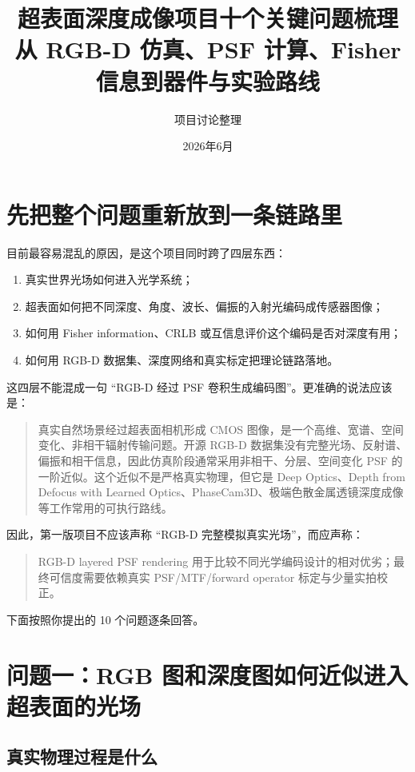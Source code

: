 \documentclass[11pt,a4paper,fontset=none]{ctexart}
\title{\bfseries 超表面深度成像项目十个关键问题梳理\\
\large 从 RGB-D 仿真、PSF 计算、Fisher 信息到器件与实验路线}
\author{项目讨论整理}
\date{2026年6月}
\begin{document}
\maketitle
\tableofcontents
\newpage

\section{先把整个问题重新放到一条链路里}

目前最容易混乱的原因，是这个项目同时跨了四层东西：
\begin{enumerate}
  \item 真实世界光场如何进入光学系统；
  \item 超表面如何把不同深度、角度、波长、偏振的入射光编码成传感器图像；
  \item 如何用 Fisher information、CRLB 或互信息评价这个编码是否对深度有用；
  \item 如何用 RGB-D 数据集、深度网络和真实标定把理论链路落地。
\end{enumerate}

这四层不能混成一句 ``RGB-D 经过 PSF 卷积生成编码图''。更准确的说法应该是：
\begin{quote}
真实自然场景经过超表面相机形成 CMOS 图像，是一个高维、宽谱、空间变化、非相干辐射传输问题。开源 RGB-D 数据集没有完整光场、反射谱、偏振和相干信息，因此仿真阶段通常采用非相干、分层、空间变化 PSF 的一阶近似。这个近似不是严格真实物理，但它是 Deep Optics、Depth from Defocus with Learned Optics、PhaseCam3D、极端色散金属透镜深度成像等工作常用的可执行路线。
\end{quote}

因此，第一版项目不应该声称 ``RGB-D 完整模拟真实光场''，而应声称：
\begin{quote}
RGB-D layered PSF rendering 用于比较不同光学编码设计的相对优劣；最终可信度需要依赖真实 PSF/MTF/forward operator 标定与少量实拍校正。
\end{quote}

下面按照你提出的 10 个问题逐条回答。

\section{问题一：RGB 图和深度图如何近似进入超表面的光场}

\subsection{真实物理过程是什么}
\end{document}
